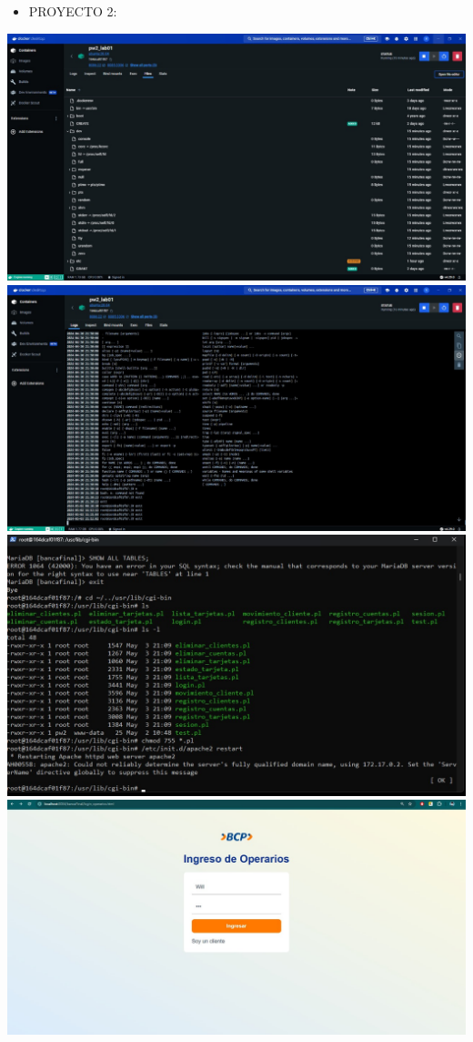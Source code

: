 \documentclass{article}
\begin{document}
\begin{itemize}		
    \item 
    PROYECTO 2:
\end{itemize}
\includegraphics[width=1\textwidth]{img/22.jpeg} 
\includegraphics[width=1\textwidth]{img/23.jpeg} 
\includegraphics[width=1\textwidth]{img/24.jpeg} 
\includegraphics[width=1\textwidth]{img/25.jpeg} 
\end{document}
